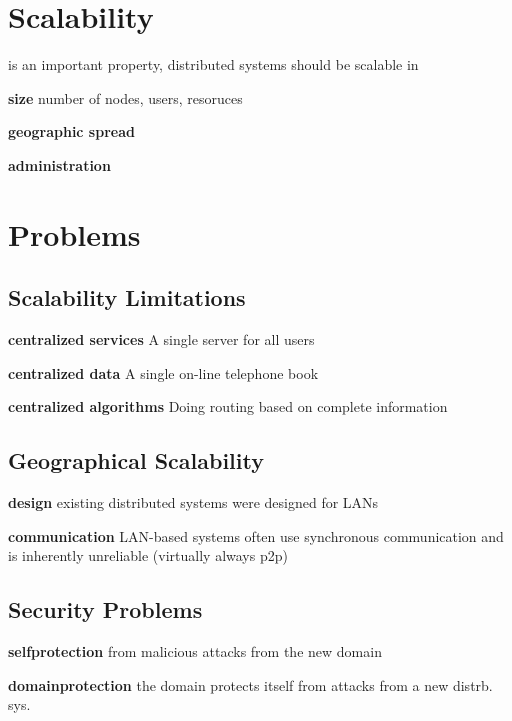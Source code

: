 \documentclass[ngerman,a4paper]{report}
\begin{document}
\section{Scalability} 
is an important property, distributed systems should be scalable in
\begin{compactitem}
\item [\textbf{size}] number of nodes, users, resoruces
\item [\textbf{geographic spread}]
\item [\textbf{administration}]
\end{compactitem}

\section{Problems}
\subsection{Scalability Limitations}
\begin{compactitem}
\item [\textbf{centralized services}] A single server for all users
\item [\textbf{centralized data}] A single on-line telephone book
\item [\textbf{centralized algorithms}] Doing routing based on complete information
\end{compactitem}
\subsection{Geographical Scalability}
\begin{compactitem}
\item [\textbf{design}] existing distributed systems were designed for LANs
\item [\textbf{communication}] LAN-based systems often use synchronous communication and is inherently unreliable (virtually always p2p)
\end{compactitem}
\subsection{Security Problems}
\begin{compactitem}
\item [\textbf{selfprotection}] from malicious attacks from the new domain
\item [\textbf{domainprotection}] the domain protects itself from attacks from a new distrb. sys.
\end{compactitem}
\end{document}
